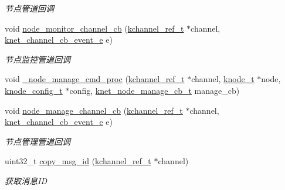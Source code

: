\begin{DoxyCompactItemize}
\begin{DoxyCompactList}\small\item\em 节点管道回调 \end{DoxyCompactList}\item 
void \hyperlink{a00101_a067d3665fb3a5e73408c4a27e5b2deca_a067d3665fb3a5e73408c4a27e5b2deca}{node\+\_\+monitor\+\_\+channel\+\_\+cb} (\hyperlink{a00066_a3b7e82599367eade261456f60ebe2cd9_a3b7e82599367eade261456f60ebe2cd9}{kchannel\+\_\+ref\+\_\+t} $\ast$channel, \hyperlink{a00066_a2fd2faf971268f5b682ab375c455f7c9_a2fd2faf971268f5b682ab375c455f7c9}{knet\+\_\+channel\+\_\+cb\+\_\+event\+\_\+e} e)
\begin{DoxyCompactList}\small\item\em 节点监控管道回调 \end{DoxyCompactList}\item 
void \hyperlink{a00101_af8d74261b6935793ff1ff23a9906d6be_af8d74261b6935793ff1ff23a9906d6be}{\+\_\+node\+\_\+manage\+\_\+cmd\+\_\+proc} (\hyperlink{a00066_a3b7e82599367eade261456f60ebe2cd9_a3b7e82599367eade261456f60ebe2cd9}{kchannel\+\_\+ref\+\_\+t} $\ast$channel, \hyperlink{a00066_a5e720b27efbc9ad744240f5f4233763a_a5e720b27efbc9ad744240f5f4233763a}{knode\+\_\+t} $\ast$node, \hyperlink{a00066_af1cfaee0eb1c76ebf06076b95cc47ee1_af1cfaee0eb1c76ebf06076b95cc47ee1}{knode\+\_\+config\+\_\+t} $\ast$config, \hyperlink{a00066_acd4bad75f444cb56dffa5f9413bbe456_acd4bad75f444cb56dffa5f9413bbe456}{knet\+\_\+node\+\_\+manage\+\_\+cb\+\_\+t} manage\+\_\+cb)
\item 
void \hyperlink{a00101_ab050f58dec9e4479cf305004252c610c_ab050f58dec9e4479cf305004252c610c}{node\+\_\+manage\+\_\+channel\+\_\+cb} (\hyperlink{a00066_a3b7e82599367eade261456f60ebe2cd9_a3b7e82599367eade261456f60ebe2cd9}{kchannel\+\_\+ref\+\_\+t} $\ast$channel, \hyperlink{a00066_a2fd2faf971268f5b682ab375c455f7c9_a2fd2faf971268f5b682ab375c455f7c9}{knet\+\_\+channel\+\_\+cb\+\_\+event\+\_\+e} e)
\begin{DoxyCompactList}\small\item\em 节点管理管道回调 \end{DoxyCompactList}\item 
uint32\+\_\+t \hyperlink{a00101_a0348f37c23e35fb569269dbe683296c8_a0348f37c23e35fb569269dbe683296c8}{copy\+\_\+msg\+\_\+id} (\hyperlink{a00066_a3b7e82599367eade261456f60ebe2cd9_a3b7e82599367eade261456f60ebe2cd9}{kchannel\+\_\+ref\+\_\+t} $\ast$channel)
\begin{DoxyCompactList}\small\item\em 获取消息\+I\+D \end{DoxyCompactList}\item 

\end{DoxyCompactItemize}
